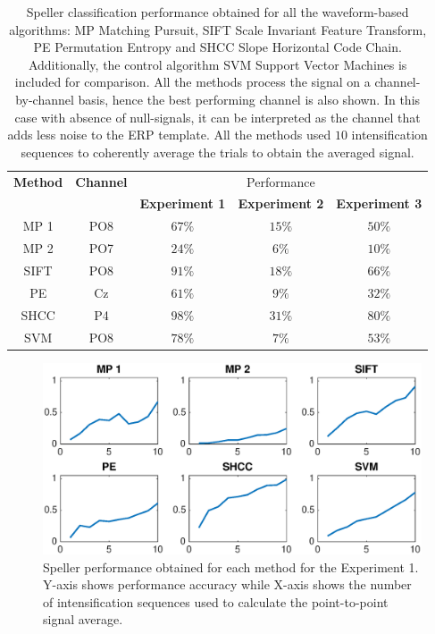 \documentclass[brainsci,article,submit,moreauthors,pdftex,10pt,a4paper]{mdpi}
\begin{document}
\begin{table}[H]
\caption{Speller classification performance obtained for all the waveform-based algorithms: MP Matching Pursuit, SIFT Scale Invariant Feature Transform, PE Permutation Entropy and SHCC Slope Horizontal Code Chain. Additionally, the control algorithm SVM Support Vector Machines is included for comparison.  All the methods process the signal on a channel-by-channel basis, hence the best performing channel is also shown. In this case with absence of null-signals, it can be interpreted as the channel that adds less noise to the ERP template.  All the methods used $10$ intensification sequences to coherently average the trials to obtain the averaged signal. }
\centering
\begin{tabular}{ccccc}
\toprule
\textbf{Method}	& \textbf{Channel} &   \multicolumn{3}{c}{Performance} \\
 	&  &  \textbf{Experiment 1} & \textbf{Experiment 2}	& \textbf{Experiment 3}\\
\midrule
MP 1 & PO8  & $67\%$ & $15\%$ & $50\%$\\
MP 2 & PO7 & $24\%$ & $6\%$ & $10\%$\\
SIFT  & PO8 & $91\%$ & $18\%$ & $66\%$\\
PE     & Cz & $61\%$ & $9\%$ & $32\%$\\
SHCC & P4 & $98\%$ & $31\%$ & $80\%$\\
SVM     & PO8  & $78\%$ & $7\%$ & $53\%$\\
\bottomrule
\end{tabular}
\label{tab:results}
\end{table}

\begin{figure}[H]
\centering
\includegraphics[width=15cm]{images/CrossPerformanceTest.eps}
\caption{Speller performance obtained for each method for the Experiment 1.  Y-axis shows performance accuracy while X-axis shows the number of intensification sequences used to calculate the point-to-point signal average.}
\label{fig:performancetest}
\end{figure}
\end{document}
